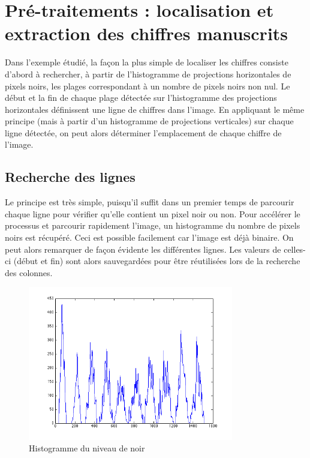 \section{Pré-traitements : localisation et extraction des chiffres manuscrits}

Dans l'exemple étudié, la façon la plus simple de localiser les chiffres consiste d'abord à rechercher, à partir de l'histogramme de projections horizontales de pixels noirs, les plages correspondant à un nombre de pixels noirs non nul. Le début et la fin de chaque plage détectée sur l'histogramme des projections horizontales définissent une ligne de chiffres dans l'image. En appliquant le même principe (mais à partir d'un histogramme de projections verticales) sur chaque ligne détectée, on peut alors déterminer l'emplacement de chaque chiffre de l'image.

\subsection{Recherche des lignes}
Le principe est très simple, puisqu'il suffit dans un premier temps de parcourir chaque ligne pour vérifier qu'elle contient un pixel noir ou non. Pour accélérer le processus et parcourir rapidement l'image, un histogramme du nombre de pixels noirs est récupéré. Ceci est possible facilement car l'image est déjà binaire. On peut alors remarquer de façon évidente les différentes lignes. Les valeurs de celles-ci (début et fin) sont alors sauvegardées pour être réutilisées lors de la recherche des colonnes.

\begin{figure}[hm]
	\begin{center}
		\includegraphics[width=0.8\textwidth]{img/10-black-level.png} 
	\end{center}
	\caption{Histogramme du niveau de noir}
\end{figure}
\newpage
